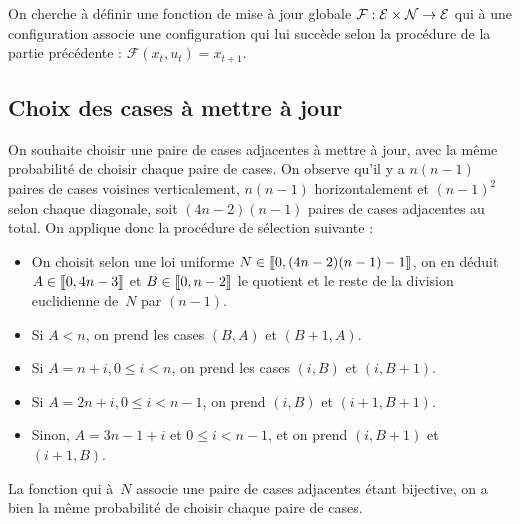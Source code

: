 On cherche à définir une fonction de mise à jour globale $\mathcal{F} : {\mathcal{E}\times\mathcal{N}}\to\mathcal{E}$ qui à une configuration associe une configuration qui lui succède selon la procédure de la partie précédente : \mbox{$\mathcal{F}(x_t, u_t) = x_{t+1}$}.

 
\subsection{Choix des cases à mettre à jour}

On souhaite choisir une paire de cases adjacentes à mettre à jour, avec la même probabilité de choisir chaque paire de cases. On observe qu'il y a $n(n-1)$ paires de cases voisines verticalement, $n(n-1)$ horizontalement et $(n-1)^2$ selon chaque diagonale, soit $(4n-2)(n-1)$ paires de cases adjacentes au total. On applique donc la procédure de sélection suivante : \begin{itemize}

\item{On choisit selon une loi uniforme $N \in [\kern-0.15em [ 0, (4n-2)(n-1) -1 ]\kern-0.15em]$, on en déduit $A \in [\kern-0.15em [ 0, 4n-3 ]\kern-0.15em]$ et $B \in [\kern-0.15em [ 0, n-2]\kern-0.15em]$ le quotient et le reste de la division euclidienne de~$N$ par $(n-1)$.  }
\item{Si $A<n$, on prend les cases $(B,A)$ et $(B+1,A)$.}
\item{Si $A = n+i, 0\leq i<n$, on prend les cases $(i,B)$ et $(i,B+1)$.}
\item{Si $A = 2n+i,0 \leq i<n-1$, on prend $(i,B)$ et $(i+1, B+1)$.}
\item{Sinon, $A = 3n-1+i$ et $0 \leq i<n-1$, et on prend $(i, B+1)$ et $(i+1, B)$.}



\end{itemize}
La fonction qui à~$N$ associe une paire de cases adjacentes étant bijective, on a bien la même probabilité de choisir chaque paire de cases. 


